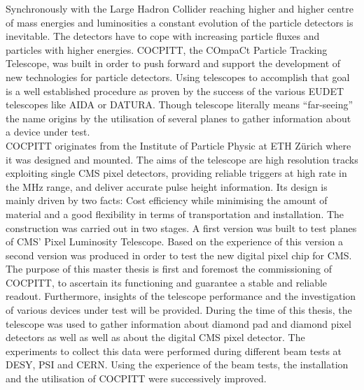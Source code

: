 Synchronously with the Large Hadron Collider reaching higher and higher centre of mass energies and luminosities a constant evolution of the particle detectors is inevitable. The detectors have to cope with increasing particle fluxes and particles with higher energies. COCPITT, the COmpaCt Particle Tracking Telescope, was built in order to push forward and support the development of new technologies for particle detectors. Using telescopes to accomplish that goal is a well established procedure as proven by the success of the various EUDET telescopes like AIDA or DATURA. Though telescope literally means ``far-seeing'' the name origins by the utilisation of several planes to gather information about a device under test.\\
COCPITT originates from the Institute of Particle Physic at ETH Z{\"u}rich where it was designed and mounted. The aims of the telescope are high resolution tracks  exploiting single CMS pixel detectors, providing reliable triggers at high rate in the MHz range, and deliver accurate pulse height information. Its design is mainly driven by two facts: Cost efficiency while minimising the amount of material and a good flexibility in terms of transportation and installation. The construction was carried out in two stages. A first version was built to test planes of CMS' Pixel Luminosity Telescope. Based on the experience of this version a second version was produced in order to test the new digital pixel chip for CMS.\\
The purpose of this master thesis is first and foremost the commissioning of COCPITT, to ascertain its functioning and guarantee a stable and reliable readout. Furthermore, insights of the telescope performance and the investigation of various devices under test will be provided. During the time of this thesis, the telescope was used to gather information about diamond pad and diamond pixel detectors as well as well as about the digital CMS pixel detector. The experiments to collect this data were performed during different beam tests at DESY, PSI and CERN. Using the experience of the beam tests, the installation and the utilisation of COCPITT were successively improved.
